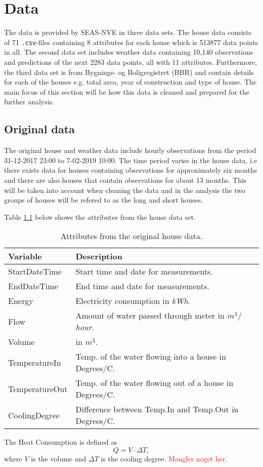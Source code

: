 \chapter{Data}
The data is provided by SEAS-NVE in three data sets. The house data consists of 71 \texttt{.csv}-files containing 8 attributes for each house which is 513877 data points in all. The second data set includes weather data containing 10,140 observations and predictions of the next 2283 data points, all with 11 attributes. Furthermore, the third data set is from Bygnings- og Boligregistret (BBR) and contain details for each of the houses e.g. total area, year of construction and type of house. 
The main focus of this section will be how this data is cleaned and prepared for the further analysis. 

\section{Original data}
The original house and weather data include hourly observations from the period 31-12-2017 23:00 to 7-02-2019 10:00. The time period varies in the house data, i.e there exists data for houses containing observations for approximately six months and there are also houses that contain observations for about 13 months. This will be taken into account when cleaning the data and in the analysis the two groups of houses will be refered to as the long and short houses. 

\noindent Table \ref{tab: housedata} below shows the attributes from the house data set. 
\begin{table}[H]
    \centering
    \begin{tabular}{ll}
     \hline
     \textbf{Variable} & \textbf{Description} \\
    \hline
    \hline
    StartDateTime  &  Start time and date for measurements.\\
    EndDateTime  &  End time and date for measurements.\\
    Energy  &  Electricity consumption in \textit{kWh}.\\
    Flow  &  Amount of water passed through meter in \textit{$m^3/$hour}.\\
    Volume & in $m^3$.\\
    TemperatureIn  &  Temp. of the water flowing into a house in Degrees/C. \\
    TemperatureOut  & Temp. of the water flowing out of a house in Degrees/C.\\
    CoolingDegree  &  Difference between Temp.In and Temp.Out in Degrees/C. \\
    \hline
    \end{tabular}
    \caption{Attributes from the original house data.}
    \label{tab: housedata}
\end{table}
\noindent The Heat Consumption is defined as 
\begin{equation}
    Q = V\cdot \Delta T,
    \label{eq: Q_heat}
\end{equation}
where $V$ is the volume and $\Delta T$ is the cooling degree. \textcolor{red}{Mangler noget her.} \\

